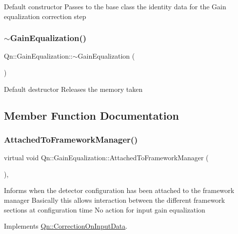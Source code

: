 Default constructor Passes to the base class the identity data for the Gain equalization correction step \mbox{\label{classQn_1_1GainEqualization_a29526efb0749db5c5436edae080aea93}} 
\subsubsection{\texorpdfstring{$\sim$\+Gain\+Equalization()}{~GainEqualization()}}
{\footnotesize\ttfamily Qn\+::\+Gain\+Equalization\+::$\sim$\+Gain\+Equalization (\begin{DoxyParamCaption}{ }\end{DoxyParamCaption})}

Default destructor Releases the memory taken 

\subsection{Member Function Documentation}
\mbox{\label{classQn_1_1GainEqualization_a487cc533ff299196a16d0ee4688d1039}} 
\subsubsection{\texorpdfstring{Attached\+To\+Framework\+Manager()}{AttachedToFrameworkManager()}}
{\footnotesize\ttfamily virtual void Qn\+::\+Gain\+Equalization\+::\+Attached\+To\+Framework\+Manager (\begin{DoxyParamCaption}{ }\end{DoxyParamCaption})\hspace{0.3cm}{\ttfamily [inline]}, {\ttfamily [virtual]}}

Informs when the detector configuration has been attached to the framework manager Basically this allows interaction between the different framework sections at configuration time No action for input gain equalization 

Implements \mbox{\hyperlink{classQn_1_1CorrectionOnInputData_adab1d79e0c216c6c981cd8d7ed271490}{Qn\+::\+Correction\+On\+Input\+Data}}.

